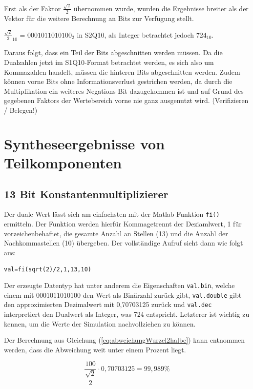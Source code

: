 Erst als der Faktor $\frac{\sqrt{2}}{2}$ übernommen wurde, wurden die Ergebnisse breiter als der Vektor für die weitere Berechnung an Bits zur Verfügung stellt.

${\frac{\sqrt{2}}{2}}_{10}$ = $0001011010100_2$ in S2Q10, als Integer betrachtet jedoch $724_{10}$.

Daraus folgt, dass ein Teil der Bits abgeschnitten werden müssen. Da die Dualzahlen jetzt im S1Q10-Format betrachtet werden, es sich also um Kommazahlen handelt,
müssen die hinteren Bits abgeschnitten werden. Zudem können vorne Bits ohne Informationsverlust gestrichen werden, da durch die Multiplikation ein weiteres 
Negations-Bit dazugekommen ist und auf Grund des gegebenen Faktors der Wertebereich vorne nie ganz ausgenutzt wird. (Verifizieren / Belegen!)



\section{Syntheseergebnisse von Teilkomponenten}\label{sec:Syntheseergebnisse}
\subsection{13 Bit Konstantenmultiplizierer}\label{sec:Konstantenmultiplizierer}

Der duale Wert lässt sich am einfachsten mit der Matlab-Funktion \texttt{fi()} ermitteln. Der Funktion werden hierfür Kommagetrennt der Deziamlwert, 1 für vorzeichenbehaftet,
die gesamte Anzahl an Stellen (13) und die Anzahl der Nachkommastellen (10) übergeben. Der vollständige Aufruf sieht dann wie folgt aus:

\texttt{val=fi(sqrt(2)/2,1,13,10)}

Der erzeugte Datentyp hat unter anderem die Eigenschaften \texttt{val.bin}, welche einem mit $0001011010100$ den Wert als Binärzahl zurück gibt, 
\texttt{val.double} gibt den approximierten Dezimalwert mit 0,70703125 zurück und \texttt{val.dec} interpretiert den Dualwert als Integer, was 724 entspricht.
Letzterer ist wichtig zu kennen, um die Werte der Simulation nachvollziehen zu können.

Der Berechnung aus Gleichung (\ref{eq:abweichungWurzel2halbe}) kann entnommen werden, dass die Abweichung weit unter einem Prozent liegt.

\begin{equation}\label{eq:abweichungWurzel2halbe}
 \frac{100}{\dfrac{\sqrt{2}}{2}}\cdot 0,70703125 = 99,989\%
\end{equation}

